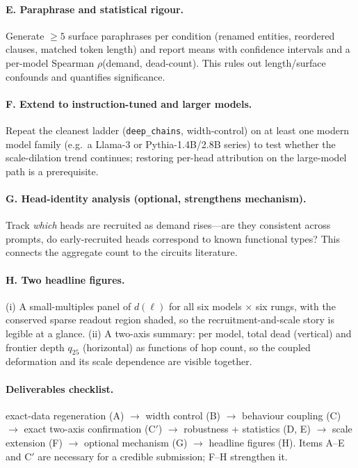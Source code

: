 \documentclass[11pt]{article}
\newcommand{\dl}{d(\ell)}
\begin{document}
\paragraph{E. Paraphrase and statistical rigour.}
Generate $\geq5$ surface paraphrases per condition (renamed entities, reordered
clauses, matched token length) and report means with confidence intervals and a
per-model Spearman $\rho$(demand, dead-count). This rules out length/surface
confounds and quantifies significance.

\paragraph{F. Extend to instruction-tuned and larger models.}
Repeat the cleanest ladder (\texttt{deep\_chains}, width-control) on at least
one modern model family (e.g.\ a Llama-3 or Pythia-1.4B/2.8B series) to test
whether the scale-dilation trend continues; restoring per-head attribution on
the large-model path is a prerequisite.

\paragraph{G. Head-identity analysis (optional, strengthens mechanism).}
Track \emph{which} heads are recruited as demand rises---are they consistent
across prompts, do early-recruited heads correspond to known functional types?
This connects the aggregate count to the circuits literature.

\paragraph{H. Two headline figures.}
(i) A small-multiples panel of $\dl$ for all six models $\times$ six rungs,
with the conserved sparse readout region shaded, so the recruitment-and-scale
story is legible at a glance. (ii) A two-axis summary: per model, total dead
(vertical) and frontier depth $q_{25}$ (horizontal) as functions of hop count,
so the coupled deformation and its scale dependence are visible together.

\paragraph{Deliverables checklist.}
exact-data regeneration (A) $\to$ width control (B) $\to$ behaviour coupling
(C) $\to$ exact two-axis confirmation (C$'$) $\to$ robustness + statistics
(D, E) $\to$ scale extension (F) $\to$ optional mechanism (G) $\to$ headline
figures (H). Items A--E and C$'$ are necessary for a credible submission;
F--H strengthen it.
\end{document}
